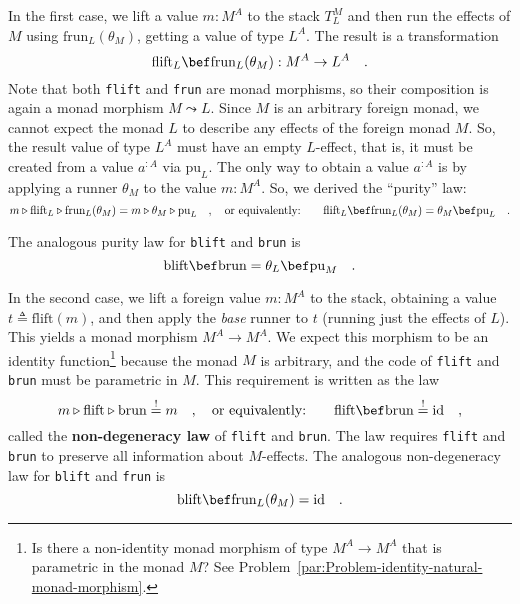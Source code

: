 In the first case, we lift a value $m:M^{A}$ to the stack $T_{L}^{M}$
and then run the effects of $M$ using $\text{frun}_{L}(\theta_{M})$,
getting a value of type $L^{A}$. The result is a transformation
\[
\text{flift}_{L}\bef\text{frun}_{L}(\theta_{M}):M^{A}\rightarrow L^{A}\quad.
\]
Note that both \lstinline!flift! and \lstinline!frun! are monad
morphisms, so their composition is again a monad morphism $M\leadsto L$.
Since $M$ is an arbitrary foreign monad, we cannot expect the monad
$L$ to describe any effects of the foreign monad $M$. So, the result
value of type $L^{A}$ must have an empty $L$-effect, that is, it
must be created from a value $a^{:A}$ via $\text{pu}_{L}$. The only
way to obtain a value $a^{:A}$ is by applying a runner $\theta_{M}$
to the value $m:M^{A}$. So, we derived the \textsf{``}purity\textsf{''} law:
\[
m\triangleright\text{flift}_{L}\triangleright\text{frun}_{L}(\theta_{M})=m\triangleright\theta_{M}\triangleright\text{pu}_{L}\quad,\quad\text{or equivalently:}\quad\quad\text{flift}_{L}\bef\text{frun}_{L}(\theta_{M})=\theta_{M}\bef\text{pu}_{L}\quad.
\]

The analogous purity law
for \lstinline!blift! and \lstinline!brun! is
\[
\text{blift}\bef\text{brun}=\theta_{L}\bef\text{pu}_{M}\quad.
\]

In the second case, we lift a foreign value $m:M^{A}$ to the stack,
obtaining a value $t\triangleq\text{flift}\left(m\right)$, and then
apply the \emph{base} runner to $t$ (running just the effects of
$L$). This yields a monad morphism $M^{A}\rightarrow M^{A}$. We
expect this morphism to be an identity function\footnote{Is there a non-identity monad morphism of type $M^{A}\rightarrow M^{A}$
that is parametric in the monad $M$? See Problem~\ref{par:Problem-identity-natural-monad-morphism}.} because the monad $M$ is arbitrary, and the code of \lstinline!flift!
and \lstinline!brun! must be parametric in $M$. This requirement
is written as the law
\[
m\triangleright\text{flift}\triangleright\text{brun}\overset{!}{=}m\quad,\quad\text{or equivalently:}\quad\quad\text{flift}\bef\text{brun}\overset{!}{=}\text{id}\quad,
\]
called the \textbf{non-degeneracy law}
of \lstinline!flift! and \lstinline!brun!. The law requires \lstinline!flift!
and \lstinline!brun! to preserve all information about $M$-effects.
The analogous non-degeneracy law for \lstinline!blift! and \lstinline!frun!
is
\[
\text{blift}\bef\text{frun}_{L}(\theta_{M})=\text{id}\quad.
\]



